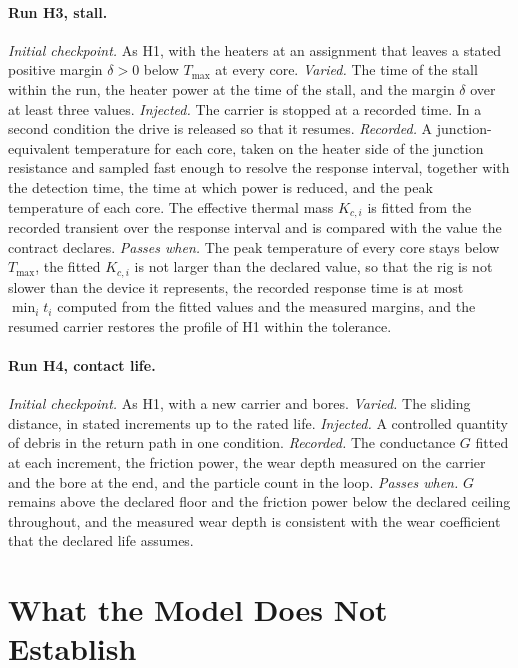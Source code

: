 \documentclass[11pt]{article}
\theoremstyle{definition}
\theoremstyle{plain}
\theoremstyle{remark}
\begin{document}
\paragraph{Run H3, stall.} \emph{Initial checkpoint.} As H1, with the heaters at an assignment that leaves a stated positive margin $\delta>0$ below $T_{\max}$ at every core. \emph{Varied.} The time of the stall within the run, the heater power at the time of the stall, and the margin $\delta$ over at least three values. \emph{Injected.} The carrier is stopped at a recorded time. In a second condition the drive is released so that it resumes. \emph{Recorded.} A junction-equivalent temperature for each core, taken on the heater side of the junction resistance and sampled fast enough to resolve the response interval, together with the detection time, the time at which power is reduced, and the peak temperature of each core. The effective thermal mass $K_{c,i}$ is fitted from the recorded transient over the response interval and is compared with the value the contract declares. \emph{Passes when.} The peak temperature of every core stays below $T_{\max}$, the fitted $K_{c,i}$ is not larger than the declared value, so that the rig is not slower than the device it represents, the recorded response time is at most $\min_it_i$ computed from the fitted values and the measured margins, and the resumed carrier restores the profile of H1 within the tolerance.

\paragraph{Run H4, contact life.} \emph{Initial checkpoint.} As H1, with a new carrier and bores. \emph{Varied.} The sliding distance, in stated increments up to the rated life. \emph{Injected.} A controlled quantity of debris in the return path in one condition. \emph{Recorded.} The conductance $G$ fitted at each increment, the friction power, the wear depth measured on the carrier and the bore at the end, and the particle count in the loop. \emph{Passes when.} $G$ remains above the declared floor and the friction power below the declared ceiling throughout, and the measured wear depth is consistent with the wear coefficient that the declared life assumes.

\section{What the Model Does Not Establish}
\label{sec:scope}
\end{document}
